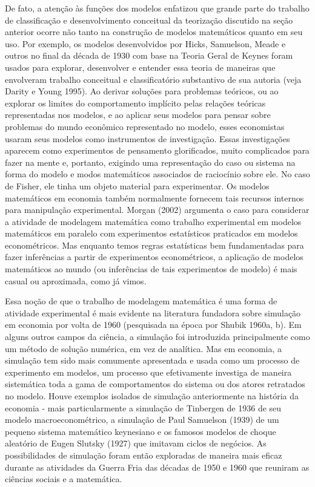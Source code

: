 \documentclass[12pt]{article}
\begin{document}
De fato, a atenção às funções dos modelos enfatizou que grande parte do trabalho de classificação e desenvolvimento conceitual da teorização discutido na seção anterior ocorre não tanto na construção de modelos matemáticos quanto em seu uso. Por exemplo, os modelos desenvolvidos por Hicks, Samuelson, Meade e outros no final da década de 1930 com base na Teoria Geral de Keynes foram usados para explorar, desenvolver e entender essa teoria de maneiras que envolveram trabalho conceitual e classificatório substantivo de sua autoria (veja Darity e Young 1995). Ao derivar soluções para problemas teóricos, ou ao explorar os limites do comportamento implícito pelas relações teóricas representadas nos modelos, e ao aplicar seus modelos para pensar sobre problemas do mundo econômico representado no modelo, esses economistas usaram seus modelos como instrumentos de investigação. Essas investigações aparecem como experimentos de pensamento glorificados, muito complicados para fazer na mente e, portanto, exigindo uma representação do caso ou sistema na forma do modelo e modos matemáticos associados de raciocínio sobre ele. No caso de Fisher, ele tinha um objeto material para experimentar. Os modelos matemáticos em economia também normalmente fornecem tais recursos internos para manipulação experimental. Morgan (2002) argumenta o caso para considerar a atividade de modelagem matemática como trabalho experimental em modelos matemáticos em paralelo com experimentos estatísticos praticados em modelos econométricos. Mas enquanto temos regras estatísticas bem fundamentadas para fazer inferências a partir de experimentos econométricos, a aplicação de modelos matemáticos ao mundo (ou inferências de tais experimentos de modelo) é mais casual ou aproximada, como já vimos.

Essa noção de que o trabalho de modelagem matemática é uma forma de atividade experimental é mais evidente na literatura fundadora sobre simulação em economia por volta de 1960 (pesquisada na época por Shubik 1960a, b). Em alguns outros campos da ciência, a simulação foi introduzida principalmente como um método de solução numérica, em vez de analítica. Mas em economia, a simulação tem sido mais comumente apresentada e usada como um processo de experimento em modelos, um processo que efetivamente investiga de maneira sistemática toda a gama de comportamentos do sistema ou dos atores retratados no modelo. Houve exemplos isolados de simulação anteriormente na história da economia - mais particularmente a simulação de Tinbergen de 1936 de seu modelo macroeconométrico, a simulação de Paul Samuelson (1939) de um pequeno sistema matemático keynesiano e os famosos modelos de choque aleatório de Eugen Slutsky (1927) que imitavam ciclos de negócios. As possibilidades de simulação foram então exploradas de maneira mais eficaz durante as atividades da Guerra Fria das décadas de 1950 e 1960 que reuniram as ciências sociais e a matemática.
\end{document}
